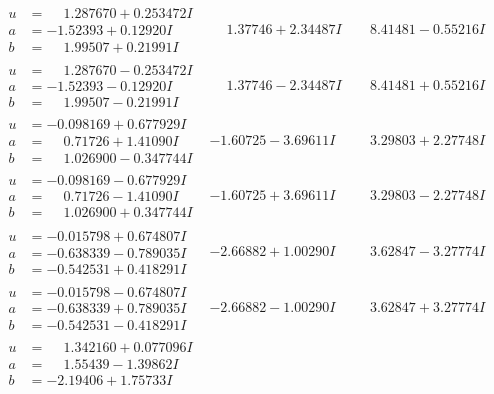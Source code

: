 \documentclass[1p]{elsarticle_modified}
\theoremstyle{definition}
\begin{document}
$$\begin{array}{c|c|c}
\begin{aligned}
u &= \phantom{-}1.287670 + 0.253472 I \\
a &= -1.52393 + 0.12920 I \\
b &= \phantom{-}1.99507 + 0.21991 I\end{aligned}
 & \phantom{-}1.37746 + 2.34487 I & \phantom{-}8.41481 - 0.55216 I \\ \hline\begin{aligned}
u &= \phantom{-}1.287670 - 0.253472 I \\
a &= -1.52393 - 0.12920 I \\
b &= \phantom{-}1.99507 - 0.21991 I\end{aligned}
 & \phantom{-}1.37746 - 2.34487 I & \phantom{-}8.41481 + 0.55216 I \\ \hline\begin{aligned}
u &= -0.098169 + 0.677929 I \\
a &= \phantom{-}0.71726 + 1.41090 I \\
b &= \phantom{-}1.026900 - 0.347744 I\end{aligned}
 & -1.60725 - 3.69611 I & \phantom{-}3.29803 + 2.27748 I \\ \hline\begin{aligned}
u &= -0.098169 - 0.677929 I \\
a &= \phantom{-}0.71726 - 1.41090 I \\
b &= \phantom{-}1.026900 + 0.347744 I\end{aligned}
 & -1.60725 + 3.69611 I & \phantom{-}3.29803 - 2.27748 I \\ \hline\begin{aligned}
u &= -0.015798 + 0.674807 I \\
a &= -0.638339 - 0.789035 I \\
b &= -0.542531 + 0.418291 I\end{aligned}
 & -2.66882 + 1.00290 I & \phantom{-}3.62847 - 3.27774 I \\ \hline\begin{aligned}
u &= -0.015798 - 0.674807 I \\
a &= -0.638339 + 0.789035 I \\
b &= -0.542531 - 0.418291 I\end{aligned}
 & -2.66882 - 1.00290 I & \phantom{-}3.62847 + 3.27774 I \\ \hline\begin{aligned}
u &= \phantom{-}1.342160 + 0.077096 I \\
a &= \phantom{-}1.55439 - 1.39862 I \\
b &= -2.19406 + 1.75733 I\end{aligned}

\end{array}$$
\end{document}
